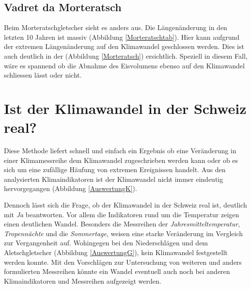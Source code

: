 \begin{refsection}
\subsection{Vadret da Morteratsch}
Beim Morteratschgletscher sieht es anders aus. Die Längenänderung in den letzten 10 Jahren ist massiv (Abbildung \ref{Morteratschtab}). Hier kann aufgrund der extremen Längenänderung auf den Klimawandel geschlossen werden. Dies ist auch deutlich in der (Abbildung \ref{Morteratsch}) ersichtlich. Speziell in diesem Fall, wäre es spannend ob die Abnahme des Eisvolumens ebenso auf den Klimawandel schliessen lässt oder nicht.





\section{Ist der Klimawandel in der Schweiz real?}
Diese Methode liefert schnell und einfach ein Ergebnis ob eine Veränderung in einer Klimamessreihe dem Klimawandel zugeschrieben werden kann oder ob es sich um eine zufällige Häufung von extremen Ereignissen handelt. Aus den analysierten Klimaindikatoren ist der Klimawandel nicht immer eindeutig hervorgegangen (Abbildung \ref{AuswertungK}). 

Dennoch lässt sich die Frage, ob der Klimawandel in der Schweiz real ist, deutlich mit \textit{Ja} beantworten. Vor allem die Indikatoren rund um die Temperatur zeigen einen deutlichen Wandel. Besonders die Messreihen der \textit{Jahresmitteltemperatur}, \textit{Tropennächte} und die \textit{Sommertage}, weisen eine starke Veränderung im Vergleich zur Vergangenheit auf. Wohingegen bei den Niederschlägen und dem Aletschgletscher (Abbildung \ref{AuswertungG}), kein Klimawandel festgestellt werden konnte. Mit den Vorschlägen zur Untersuchung von weiteren und anders formulierten Messreihen könnte ein Wandel eventuell auch noch bei anderen Klimaindikatoren und Messreihen aufgezeigt werden.



\end{refsection}
